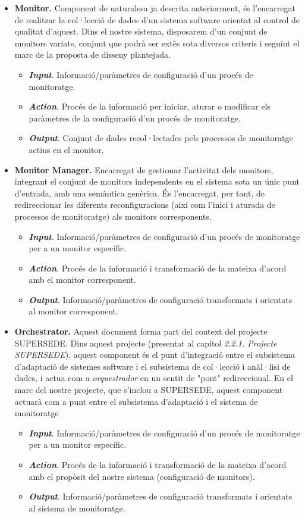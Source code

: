 \begin{itemize}
\item \textbf{Monitor.} Component de naturalesa ja descrita anteriorment, és l'encarregat de realitzar la col·lecció de dades d'un sistema software orientat al control de qualitat d'aquest. Dins el nostre sistema, disposarem d'un conjunt de monitors variats, conjunt que podrà ser extès sota diversos criteris i seguint el marc de la proposta de disseny plantejada.
\begin{itemize}
\item \textbf{\textit{Input}}. Informació/paràmetres de configuració d'un procés de monitoratge.
\item \textbf{\textit{Action}}. Procés de la informació per iniciar, aturar o modificar els paràmetres de la configuració d'un procés de monitoratge.
\item \textbf{\textit{Output}}. Conjunt de dades recol·lectades pels processos de monitoratge actius en el monitor.
\end{itemize}
\item \textbf{Monitor Manager.} Encarregat de gestionar l'activitat dels monitors, integrant el conjunt de monitors independents en el sistema sota un únic punt d'entrada, amb una semàntica genèrica. És l'encarregat, per tant, de redireccionar les diferents reconfiguracions (així com l'inici i aturada de processos de monitoratge) als monitors corresponents.
\begin{itemize}
\item \textbf{\textit{Input}}. Informació/paràmetres de configuració d'un procés de monitoratge per a un monitor específic.
\item \textbf{\textit{Action}}. Procés de la informació i transformació de la mateixa d'acord amb el monitor corresponent.
\item \textbf{\textit{Output}}. Informació/paràmetres de configuració transformats i orientats al monitor corresponent. 
\end{itemize}
\item \textbf{Orchestrator.} Aquest document forma part del context del projecte SUPERSEDE. Dins aquest projecte (presentat al capítol \textit{2.2.1. Projecte SUPERSEDE}), aquest component és el punt d'integració entre el subsistema d'adaptació de sistemes software i el subsistema de col·lecció i anàl·lisi de dades, i actua com a \textit{orquestrador} en un sentit de "pont" redireccional. En el marc del nostre projecte, que s'inclou a SUPERSEDE, aquest component actuarà com a punt entre el subsistema d'adaptació i el sistema de monitoratge
\begin{itemize}
\item \textbf{\textit{Input}}. Informació/paràmetres de configuració d'un procés de monitoratge per a un monitor específic.
\item \textbf{\textit{Action}}. Procés de la informació i transformació de la mateixa d'acord amb el propòsit del nostre sistema (configuració de monitors).
\item \textbf{\textit{Output}}. Informació/paràmetres de configuració transformats i orientats al sistema de monitoratge.
\end{itemize}
\end{itemize}

